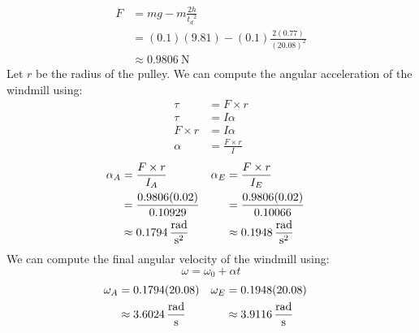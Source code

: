 \documentclass[article, 11pt]{article}
\begin{document}
    \begin{align*}
        F &= mg - m\frac{2h}{{t_d}^2} \\
          &= (0.1)(9.81) - (0.1)\frac{2(0.77)}{(20.08)^2} \\
          &\approx \SI{0.9806}{\newton}
    \end{align*}
    Let $r$ be the radius of the pulley. We can compute the angular acceleration of the windmill using:
    \begin{align*}
        \tau &= F \times r \\
        \tau &= I \alpha \\
        F \times r &= I \alpha \\
        \alpha &= \frac{F \times r}{I}
    \end{align*}
    \begin{alignat*}{2}
        \begin{aligned}
            \alpha_A  &= \frac{F \times r}{I_A} \\
                      &= \frac{0.9806(0.02)}{0.10929} \\
                      &\approx \SI{0.1794}{\frac{\radian}{\second^2}}
        \end{aligned} \quad &
        \begin{aligned}
            \alpha_E &= \frac{F \times r}{I_E} \\
                     &= \frac{0.9806(0.02)}{0.10066} \\
                     &\approx \SI{0.1948}{\frac{\radian}{\second^2}}
        \end{aligned}
    \end{alignat*}
    We can compute the final angular velocity of the windmill using:
    \begin{equation*}
        \omega = \omega_0 + \alpha t
    \end{equation*}
    \begin{alignat*}{2}
        \begin{aligned}
            \omega_A &= 0.1794(20.08) \\
                     &\approx \SI{3.6024}{\frac{\radian}{\second}}
        \end{aligned} \quad &
        \begin{aligned}
            \omega_E &= 0.1948(20.08) \\
                     &\approx \SI{3.9116}{\frac{\radian}{\second}}
        \end{aligned}
    \end{alignat*}
\end{document}
